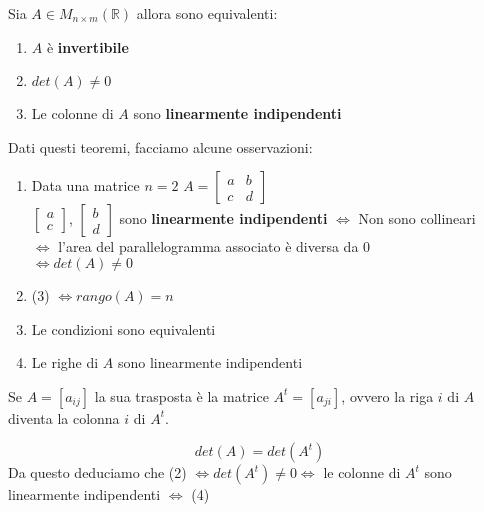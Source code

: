 \begin{theorem}
	Sia $A \in M_{n \times m}(\mathbb{R})$ allora sono equivalenti:
	\begin{enumerate}
		\item $A$ è \textbf{invertibile}
		\item $det(A) \neq 0$
		\item Le colonne di $A$ sono \textbf{linearmente indipendenti}
	\end{enumerate}
\end{theorem}

\begin{observation}
	Dati questi teoremi, facciamo alcune osservazioni:
	\begin{enumerate}
		\item Data una matrice $n=2$ $A = \begin{bmatrix}
			a& b \\
			c & d
		\end{bmatrix} $\\
		$\begin{bmatrix}
			a \\ c
		\end{bmatrix}$, $\begin{bmatrix}
			b \\ d
		\end{bmatrix}$ sono \textbf{linearmente indipendenti} $\Longleftrightarrow$ Non sono collineari \\
		$\Longleftrightarrow$ l'area del parallelogramma associato è diversa da $0$\\
		$\Longleftrightarrow det(A) \neq 0$
		
		\item (3) $\Longleftrightarrow rango(A) = n$
		\item Le condizioni sono equivalenti %
		\item Le righe di $A$ sono linearmente indipendenti
	\end{enumerate}
\end{observation}

\begin{definition}
	Se $A = [a_{ij}]$ la sua trasposta è la matrice $A^t = [a_{ji}]$, ovvero la riga $i$ di $A$ diventa la colonna $i$ di $A^t$.
\end{definition}
\begin{observation}
	\begin{equation*}
		det(A) = det(A^t)
	\end{equation*}
	Da questo deduciamo che (2) $\Longleftrightarrow det(A^t) \neq 0 \Longleftrightarrow $ le colonne di $A^t$ sono linearmente indipendenti $\Longleftrightarrow$ (4)
\end{observation}

